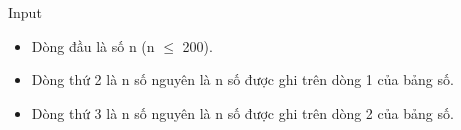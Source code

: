 Input
\begin{itemize}
	\item Dòng đầu là số n (n $\le$  200).
	\item Dòng thứ 2 là n số nguyên là n số được ghi trên dòng 1 của bảng số.
	\item Dòng thứ 3 là n số nguyên là n số được ghi trên dòng 2 của bảng số.
\end{itemize}